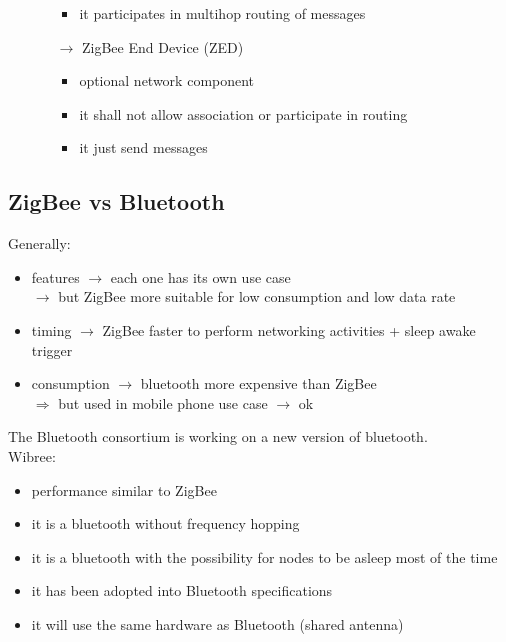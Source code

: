 \begin{itemize}
\begin{itemize}
\begin{itemize}
            \item it participates in multihop routing of messages
        \end{itemize}
        \item[$\rightarrow$] ZigBee End Device (ZED)
        \begin{itemize}
            \item optional network component
            \item it shall not allow association or participate in routing
            \item it just send messages
        \end{itemize}  
    \end{itemize}
\end{itemize}

\subsection{ZigBee vs Bluetooth}
Generally:
\begin{itemize}
    \item features $\rightarrow$ each one has its own use case\\
    $\rightarrow$ but ZigBee more suitable for low consumption and low data rate
    \item timing $\rightarrow$ ZigBee faster to perform networking activities + sleep awake trigger
    \item consumption $\rightarrow$ bluetooth more expensive than ZigBee\\
    $\Rightarrow$ but used in mobile phone use case $\rightarrow$ ok
\end{itemize}
The Bluetooth consortium is working on a new version of bluetooth.\\[0.2cm]
Wibree:
\begin{itemize}
    \item performance similar to ZigBee
    \item it is a bluetooth without frequency hopping 
    \item it is a bluetooth with the possibility for nodes
    to be asleep most of the time
    \item it has been adopted into Bluetooth specifications
    \item it will use the same hardware as Bluetooth (shared antenna)
\end{itemize}
